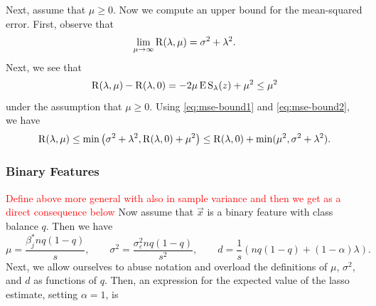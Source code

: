 Next, assume that \(\mu \geq 0\). Now we compute an upper bound for the mean-squared error. First, observe that
\begin{equation}
  \label{eq:mse-bound1}
  \lim_{\mu \rightarrow \infty} \operatorname{R}(\lambda, \mu) = \sigma^2 + \lambda^2.
\end{equation}
Next, we see that
\begin{equation}
  \label{eq:mse-bound2}
  \operatorname{R}(\lambda, \mu) - \operatorname{R}(\lambda, 0) = -2\mu \operatorname{E} \operatorname{S}_\lambda(z) + \mu^2 \leq \mu^2
\end{equation}
under the assumption that \(\mu \geq 0\). Using \eqref{eq:mse-bound1} and \eqref{eq:mse-bound2}, we have
\[
  \operatorname{R}(\lambda,\mu) \leq \min\big(\sigma^2 + \lambda^2, \operatorname{R}(\lambda, 0) + \mu^2\big) \leq \operatorname{R}(\lambda, 0) + \min(\mu^2, \sigma^2 + \lambda^2).
\]

\subsubsection{Binary Features}
\textcolor{red}{Define above more general with also in sample variance and then we get as a direct consequence below}
Now assume that \(\vec{x}\) is a binary feature with class balance \(q\). Then we have
\[
  \mu = \frac{\beta^*_j nq(1 - q)}{s}, \qquad \sigma^2 = \frac{\sigma_\varepsilon^2nq(1 - q)}{s^2}, \qquad d = \frac{1}{s} \left(nq(1 -q) + (1-\alpha)\lambda\right).
\]
Next, we allow ourselves to abuse notation and overload the definitions of \(\mu\), \(\sigma^2\), and \(d\) as functions of \(q\). Then, an expression for the expected value of the lasso estimate, setting \(\alpha = 1\), is





